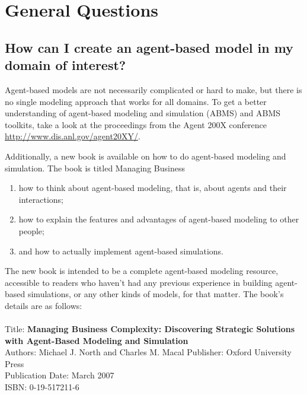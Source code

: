 \documentclass[11pt]{article}
\begin{document}
\setcounter{section}{0}
\section{General Questions}
\subsection{How can I create an agent-based model in my domain of interest?}
\label{gq:domain_of_interest}
Agent-based models are not necessarily complicated or hard to make, but there is no single modeling approach that works for all domains. To get a better understanding of agent-based modeling and simulation (ABMS) and ABMS toolkits, take a look at the proceedings from the Agent 200X conference \url{http://www.dis.anl.gov/agent20XY/}.

Additionally, a new book is available on how to do agent-based modeling and simulation. The book is titled Managing Business \begin{enumerate}
\item how to think about agent-based modeling, that is, about agents and their interactions;
\item how to explain the features and advantages of agent-based modeling to other people;
\item and how to actually implement agent-based simulations.
\end{enumerate}
The new book is intended to be a complete agent-based modeling resource, accessible to readers who haven't had any previous experience in building agent-based simulations, or any other kinds of models, for that matter.
The book's details are as follows:\\\\
Title: {\bf Managing Business Complexity: Discovering Strategic Solutions with Agent-Based Modeling and Simulation}\\
Authors: Michael J. North and Charles M. Macal Publisher: Oxford University Press\\
Publication Date: March 2007\\ 
ISBN: 0-19-517211-6\\
\end{document}
